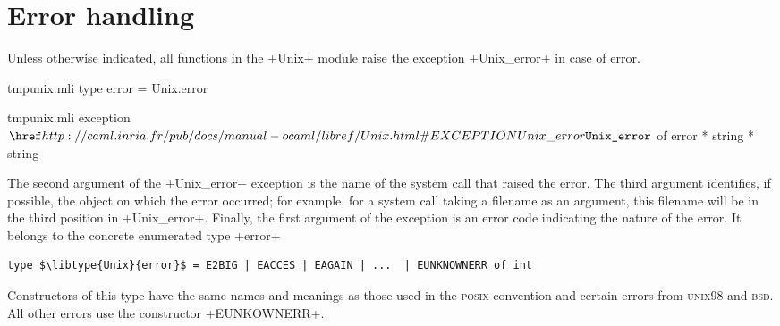 \section{Error handling}

Unless otherwise indicated, all functions in the \ml+Unix+ module
raise the exception \ml+Unix_error+ in case of error.
%
\begin{codefile}{tmpunix.mli}
type error = Unix.error
\end{codefile}
%
\begin{listingcodefile}{tmpunix.mli}
exception $\libexn{Unix}{Unix\_error}$ of error * string * string
\end{listingcodefile}
%
The second argument of the \ml+Unix_error+ exception is the name of
the system call that raised the error. The third argument identifies,
if possible, the object on which the error occurred; for example, for
a system call taking a filename as an argument, this filename will be
in the third position in \ml+Unix_error+. Finally, the first argument
of the exception is an error code indicating the nature of the
error. It belongs to the concrete enumerated type \ml+error+
%
\begin{lstlisting}
type $\libtype{Unix}{error}$ = E2BIG | EACCES | EAGAIN | ...  | EUNKNOWNERR of int
\end{lstlisting}
%
Constructors of this type have the same names and meanings as those
used in the \textsc{posix} convention and  certain errors from
\textsc{unix98} and \textsc{bsd}. All other errors use the constructor \ml+EUNKOWNERR+.

